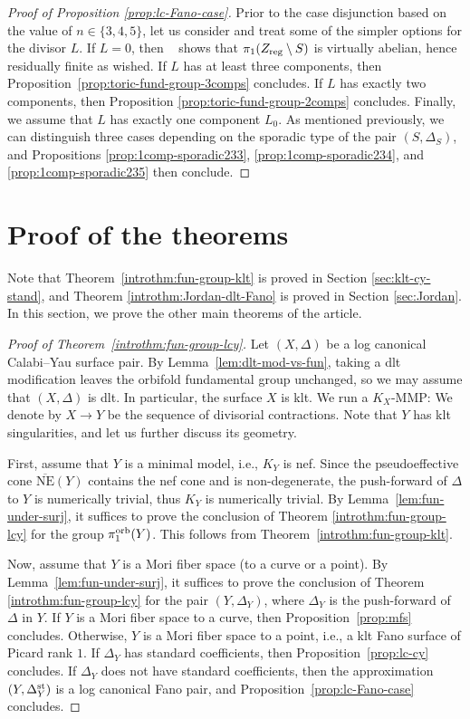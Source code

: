\documentclass{amsart}
\theoremstyle{definition}
\theoremstyle{remark}
\numberwithin{equation}{section}
\begin{document}
\begin{proof}[Proof of Proposition \ref{prop:lc-Fano-case}]
\medskip

Prior to the case disjunction based on the value of $n\in\{3,4,5\}$, let us consider and treat some of the simpler options for the divisor $L$.
If $L=0$, then ~\cite[Corollary 1.6]{KM99} shows that $\pi_1(Z_{\rm reg}\setminus S)$ is virtually abelian, hence residually finite as wished. If $L$ has at least three components, then Proposition~\ref{prop:toric-fund-group-3comps} concludes. If $L$ has exactly two components, then Proposition \ref{prop:toric-fund-group-2comps} concludes. Finally, we assume that $L$ has exactly one component $L_0$. As mentioned previously, we can distinguish three cases depending on the sporadic type of the pair $(S,\Delta_S)$, and Propositions \ref{prop:1comp-sporadic233}, \ref{prop:1comp-sporadic234}, and \ref{prop:1comp-sporadic235} then conclude. 
\end{proof}

\section{Proof of the theorems}
\label{sec:proofs}

Note that Theorem~\ref{introthm:fun-group-klt} is proved in Section \ref{sec:klt-cy-stand}, and Theorem \ref{introthm:Jordan-dlt-Fano} is proved in Section \ref{sec:Jordan}.
In this section, we prove the other main theorems of the article.

\begin{proof}[Proof of Theorem~\ref{introthm:fun-group-lcy}]
Let $(X,\Delta)$ be a log canonical Calabi--Yau surface pair.
By Lemma~\ref{lem:dlt-mod-vs-fun}, taking a dlt modification leaves the orbifold fundamental group unchanged, so we may assume that $(X,\Delta)$ is dlt. In particular, the surface $X$ is klt.
We run a $K_X$-MMP: We denote by $X\rightarrow Y$ be the sequence of divisorial contractions. Note that $Y$ has klt singularities, and let us further discuss its geometry.

First, assume that $Y$ is a minimal model, i.e., $K_Y$ is nef. Since the pseudoeffective cone $\overline{\mathrm{NE}}(Y)$ contains the nef cone and is non-degenerate, the push-forward of $\Delta$ to $Y$ is numerically trivial, thus $K_Y$ is numerically trivial.
By Lemma~\ref{lem:fun-under-surj}, it suffices to prove the conclusion of Theorem \ref{introthm:fun-group-lcy} for the group $\pi_1^{\rm orb}(Y)$.
This follows from Theorem~\ref{introthm:fun-group-klt}.

Now, assume that $Y$ is a Mori fiber space (to a curve or a point).
By Lemma~\ref{lem:fun-under-surj},
it suffices to prove the conclusion of Theorem \ref{introthm:fun-group-lcy} for the pair $(Y,\Delta_Y)$, where $\Delta_Y$ is the push-forward of $\Delta$ in $Y$.
If $Y$ is a Mori fiber space to a curve, then Proposition~\ref{prop:mfs} concludes.
Otherwise, $Y$ is a Mori fiber space to a point, i.e., a klt Fano surface of Picard rank $1$. If $\Delta_Y$ has standard coefficients, then Proposition~\ref{prop:lc-cy} concludes. If $\Delta_Y$ does not have standard coefficients, then the approximation $(Y,\Delta_Y^{\rm st})$ is a log canonical Fano pair, and Proposition~\ref{prop:lc-Fano-case} concludes.
\end{proof}
\end{document}
